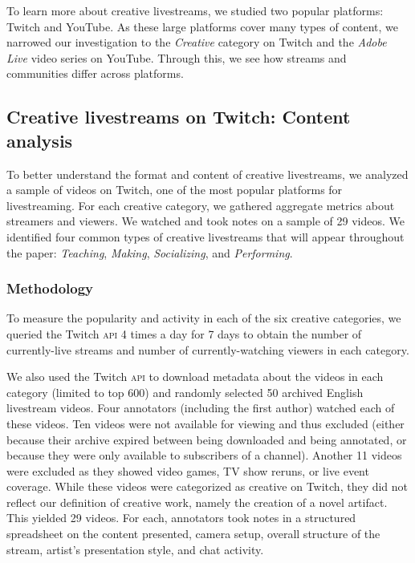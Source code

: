To learn more about creative livestreams, we studied two popular platforms: Twitch and YouTube. As these large platforms cover many types of content, we narrowed our investigation to the \textit{Creative} category on Twitch and the \textit{Adobe Live} video series on YouTube. Through this, we see how streams and communities differ across platforms.  

\subsection{Creative livestreams on Twitch: Content analysis}
To better understand the format and content of creative live\-streams, we analyzed a sample of videos on Twitch, one of the most popular platforms for livestreaming. For each creative category, we gathered aggregate metrics about streamers and viewers. We watched and took notes on a sample of 29 videos. We identified four common types of creative livestreams that will appear throughout the paper: \textit{Teaching}, \textit{Making}, \textit{Socializing}, and \textit{Performing}.

\subsubsection{Methodology}
To measure the popularity and activity in each of the six creative categories, we queried the Twitch \textsc{api} 4 times a day for 7 days to obtain the number of currently-live streams and number of currently-watching viewers in each category.

We also used the Twitch \textsc{api} to download metadata about the videos in each category (limited to top 600)
and randomly selected 50 archived English livestream videos. Four annotators (including the first author) watched each of these videos. Ten videos were not available for viewing and thus excluded (either because their archive expired between being downloaded and being annotated, or because they were only available to subscribers of a channel). Another 11 videos were excluded as they showed video games, TV show reruns, or live event coverage. While these videos were categorized as creative on Twitch, they did not reflect our definition of creative work, namely the creation of a novel artifact. This yielded 29 videos. For each, annotators took notes in a structured spreadsheet on the content presented, camera setup, overall structure of the stream, artist's presentation style, and chat activity.

